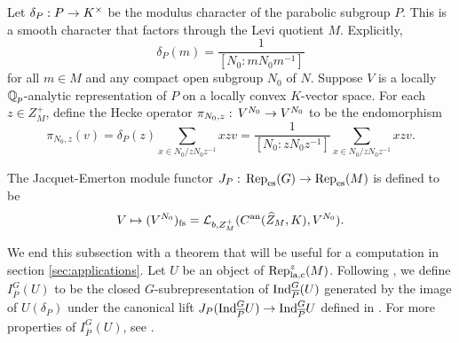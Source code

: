 \documentclass[10pt]{amsart}
\begin{document}
Let $\delta_{P}: P\rightarrow K^{\times}$ be the modulus character of the parabolic subgroup $P$. This is a smooth character that factors through the Levi quotient $M$. Explicitly, \[
    \delta_{P}(m)=\frac{1}{\left[N_{0}:mN_{0}m^{-1}\right]}
\] for all $m\in M$ and any compact open subgroup $N_{0}$ of $N$. 
Suppose $V$ is a locally $\mathbb{Q}_{p}$-analytic representation of $P$ on a locally convex $K$-vector space. For each $z\in Z_{M}^{+}$, define the Hecke operator $\pi_{N_{0},z}:\,V^{N_{0}} \rightarrow V^{N_{0}}$ to be the endomorphism \begin{equation}\label{eqn:original_Hecke}
      \pi_{N_{0},z}(v)=\delta_{P}(z) \underset{x\in N_{0}/zN_{0}z^{-1}}{\sum} xzv = \frac{1}{\left[N_{0}:zN_{0}z^{-1}\right]} \underset{x\in N_{0}/zN_{0}z^{-1}}{\sum} xzv.
\end{equation}
\begin{definition}\label{def:Jacquet}
The Jacquet-Emerton module functor $J_{P}:\,\textnormal{Rep}_{\textnormal{es}}(G)\rightarrow \textnormal{Rep}_{\textnormal{es}}(M)$ is defined to be \[
    V \mapsto (V^{N_{0}})_{\textnormal{fs}} = \mathcal{L}_{b,Z_{M}^{+}}(C^{\textnormal{an}}(\widehat{Z}_{M},K),V^{N_{0}}).
\]
\end{definition}

We end this subsection with a theorem that will be useful for a computation in section \ref{sec:applications}. Let $U$ be an object of $\textnormal{Rep}_{\textnormal{la,c}}^{z}(M)$. Following \cite{Jacquet2}, we define $I_{\overline{P}}^{G}(U)$ to be the closed $G$-subrepresentation of $\textnormal{Ind}_{\overline{P}}^{G}(U)$ generated by the image of $U(\delta_{P})$ under the canonical lift $J_{P}(\textnormal{Ind}_{\overline{P}}^{G}U)\rightarrow \textnormal{Ind}_{\overline{P}}^{G}U$ defined in \cite[(3.4.8)]{Jacquet1}. For more properties of $I_{\overline{P}}^{G}(U)$, see \cite[]{Jacquet2}. 
\end{document}
